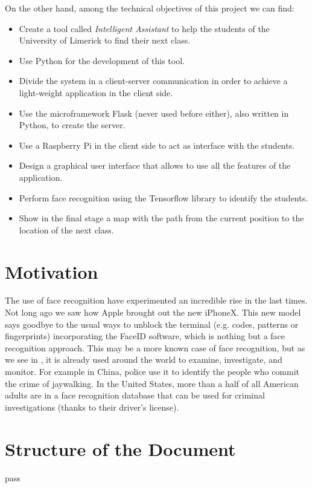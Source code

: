 On the other hand, among the technical objectives of this project we can find:

\begin{itemize}
	\item Create a tool called \textit{Intelligent Assistant} to help the students of the University of Limerick to find their next class.
	\item Use Python for the development of this tool.
	\item Divide the system in a client-server communication in order to achieve a light-weight application in the client side.
	\item Use the microframework Flask (never used before either), also written in Python, to create the server.
	\item Use a Raspberry Pi in the client side to act as interface with the students.
	\item Design a graphical user interface that allows to use all the features of the application.
	\item Perform face recognition using the Tensorflow library to identify the students.
	\item Show in the final stage a map with the path from the current position to the location of the next class.
\end{itemize}

\section{Motivation}
The use of face recognition have experimented an incredible rise in the last times. Not long ago we saw how Apple brought out the new iPhoneX. This new model says goodbye to the usual ways to unblock the terminal (e.g. codes, patterns or fingerprints) incorporating the FaceID software, which is nothing but a face recognition approach. This may be a more known case of face recognition, but as we see in \cite{iphonex_and_other_uses}, it is already used around the world to examine, investigate, and monitor. For example in China, police use it to identify the people who commit the crime of jaywalking. In the United States, more than a half of all American adults are in a face recognition database that can be used for criminal investigations (thanks to their driver’s license).

\section{Structure of the Document}
pass



